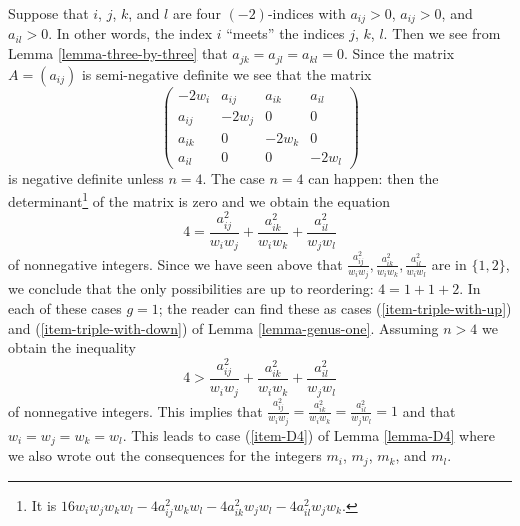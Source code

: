 \noindent
Suppose that $i$, $j$, $k$,
and $l$ are four $(-2)$-indices with $a_{ij} > 0$, $a_{ij} > 0$, and
$a_{il} > 0$. In other words, the index $i$ ``meets'' the indices
$j$, $k$, $l$. Then we see from Lemma \ref{lemma-three-by-three} that
$a_{jk} = a_{jl} = a_{kl} = 0$. Since the matrix $A = (a_{ij})$ is
semi-negative definite we see that the matrix
$$
\left(
\begin{matrix}
-2w_i & a_{ij} & a_{ik} & a_{il} \\
a_{ij} & -2w_j & 0 & 0 \\
a_{ik} & 0 & -2w_k & 0 \\
a_{il} & 0 & 0 & -2w_l
\end{matrix}
\right)
$$
is negative definite unless $n = 4$. The case $n = 4$ can happen:
then the determinant\footnote{It is
$16w_iw_jw_kw_l - 4a_{ij}^2w_kw_l - 4a_{ik}^2w_jw_l - 4a_{il}^2w_jw_k$.}
of the matrix is zero and we obtain the equation
$$
4 = \frac{a_{ij}^2}{w_iw_j} + \frac{a_{ik}^2}{w_iw_k} + \frac{a_{il}^2}{w_jw_l}
$$
of nonnegative integers. Since we have seen above that
$\frac{a_{ij}^2}{w_iw_j}, \frac{a_{ik}^2}{w_iw_k}, \frac{a_{il}^2}{w_iw_l}$
are in $\{1, 2\}$, we conclude that the only possibilities
are up to reordering: $4 = 1 + 1 + 2$. In each of these
cases $g = 1$; the reader can find these as cases
(\ref{item-triple-with-up}) and (\ref{item-triple-with-down}) of
Lemma \ref{lemma-genus-one}. Assuming $n > 4$
we obtain the inequality
$$
4 > \frac{a_{ij}^2}{w_iw_j} + \frac{a_{ik}^2}{w_iw_k} + \frac{a_{il}^2}{w_jw_l}
$$
of nonnegative integers. This implies that $\frac{a_{ij}^2}{w_iw_j} =
\frac{a_{ik}^2}{w_iw_k} = \frac{a_{il}^2}{w_jw_l} = 1$
and that $w_i = w_j = w_k = w_l$. This leads to case
(\ref{item-D4}) of Lemma \ref{lemma-D4}
where we also wrote out the consequences for the integers $m_i$, $m_j$, $m_k$,
and $m_l$.

